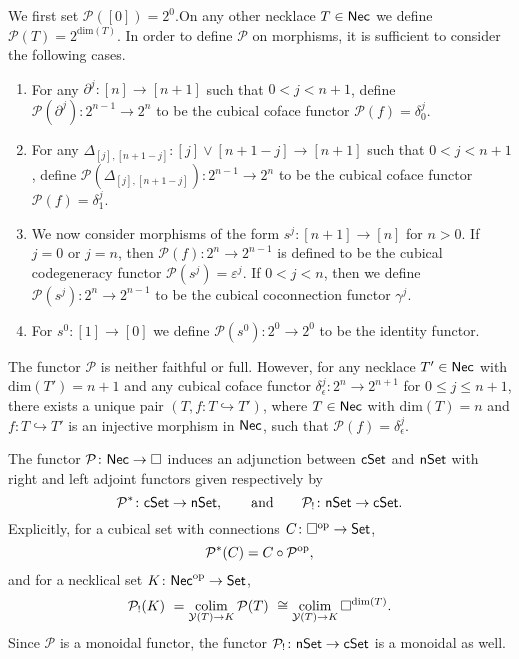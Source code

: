 We first set $\mathcal{P}([0])=2^0$.On any other necklace $T \in \mathsf{Nec}$ we define $\mathcal{P}( T )= 2^{\text{dim}(T)}$.
In order to define $\mathcal{P}$ on morphisms, it is sufficient to consider the following cases.
\begin{enumerate}
	\item For any $\partial^j \colon [n] \to [n+1]$ such that $0< j<{n+1}$, define $\mathcal{P}(\partial^j) \colon 2^{n-1}\to 2^{n}$ to be the cubical coface functor $\mathcal{P}(f)= \delta_0^{j}.$ 
	
	\item For any $\Delta_{[j], [n+1-j]} \colon [j] \vee [n+1-j] \to [n+1]$ such that $0<j<n+1$, define $\mathcal{P}(\Delta_{[j], [n+1-j]}) \colon 2^{n-1}\to 2^{n}$ to be the cubical coface functor $\mathcal{P}(f)=\delta_1^{j}$.
	
	\item We now consider morphisms of the form $s^j \colon [n+1] \to [n]$ for $n>0$.
	If $j=0$ or $j=n$, then $\mathcal{P}(f) \colon 2^n \to 2^{n-1}$ is defined to be the cubical codegeneracy functor $\mathcal{P}(s^j)= \varepsilon^{j}.$ If $0<j<n$, then we define $\mathcal{P}(s^j) \colon 2^n \to 2^{n-1}$ to be the cubical coconnection functor $\gamma^{j}.$
	
	\item For $s^0 \colon [1] \to [0]$ we define $\mathcal{P}(s^0) \colon 2^0 \to 2^0$ to be the identity functor.
\end{enumerate}

\begin{remark}
	The functor $\mathcal{P}$ is neither faithful or full.
	However, for any necklace $T' \in \mathsf{Nec}$ with $\text{dim}(T')=n+1$ and any cubical coface functor $\delta_{\epsilon}^j \colon 2^n \to 2^{n+1}$ for $0 \leq j \leq n+1$, there exists a unique pair $(T, f \colon T \hookrightarrow T')$, where $T \in \mathsf{Nec}$ with $\text{dim}(T)=n$ and $f \colon T \hookrightarrow T'$ is an injective morphism in $\mathsf{Nec}$, such that $\mathcal{P}(f) = \delta_{\epsilon}^j $.
\end{remark}

The functor $\mathcal{P} \colon \mathsf{Nec} \to \square$ induces an adjunction between $\mathsf{cSet}$ and $\mathsf{nSet}$ with right and left adjoint functors given respectively by
\begin{equation*}
\mathcal{P}^* \colon \mathsf{cSet} \to \mathsf{nSet},
\qquad \text{and} \qquad
\mathcal{P}_{!}  \colon \mathsf{nSet} \to \mathsf{cSet}.
\end{equation*}
Explicitly, for a cubical set with connections $C \colon \square^{\mathrm{op}} \to \mathsf{Set}$, \begin{equation*}
\mathcal{P}^*(C)= C \circ \mathcal{P}^{\mathrm{op}},
\end{equation*}
and for a necklical set $K \colon \mathsf{Nec}^{\mathrm{op}} \to \mathsf{Set}$,
\begin{equation*}
\mathcal{P}_{!}(K) \ =
\operatorname*{colim}_{\mathcal{Y}(T) \to K} \mathcal{P}(T) \ \cong 
\operatorname*{colim}_{\mathcal{Y}(T) \to K} \square^{\text{dim}(T)}.
\end{equation*}
Since $\mathcal{P}$ is a monoidal functor, the functor $\mathcal{P}_{!} \colon \mathsf{nSet} \to \mathsf{cSet}$ is a monoidal as well.

